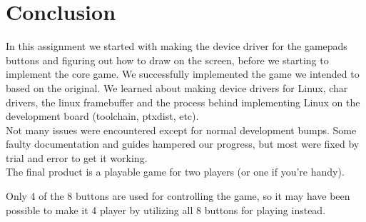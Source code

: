 \chapter{Conclusion}
In this assignment we started with making the device driver for the gamepads buttons and figuring out how to draw on the screen, before we starting to implement the core game. 
We successfully implemented the game we intended to based on the original. We learned about making device drivers for Linux, char drivers, the linux framebuffer and the process behind implementing Linux on the development board (toolchain, ptxdist, etc).
\\
Not many issues were encountered except for normal development bumps. Some faulty documentation and guides hampered our progress, but most were fixed by trial and error to get it working. 
\\
The final product is a playable game for two players (or one if you're handy).

Only 4 of the 8 buttons are used for controlling the game, so it may have been possible to make it 4 player by utilizing all 8 buttons for playing instead.  